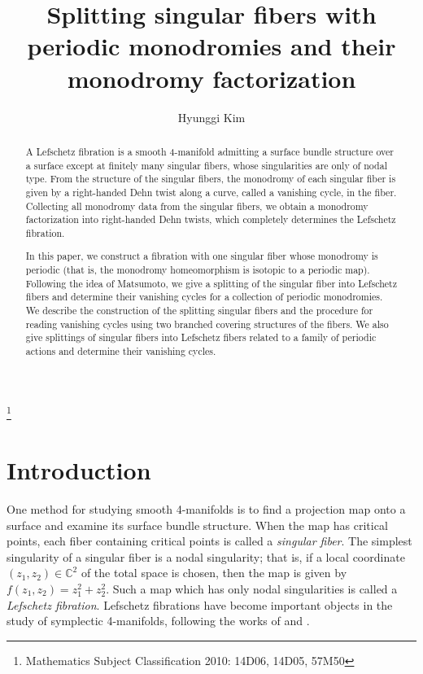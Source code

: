 \documentclass[10pt,a4paper,reqno]{amsart}
\theoremstyle{definition}
\numberwithin{equation}{section}
\numberwithin{figure}{section}
\newcommand{\C}{\mathbb{C}}
\begin{document}
\title[Splitting singular fibers]
{Splitting singular fibers with periodic monodromies and their monodromy factorization}

\author[H. Kim]{Hyunggi Kim}
\address{Research Institute of Mathematics, Seoul National University, Korea}

\thanks{Mathematics Subject Classification 2010: 14D06, 14D05, 57M50}

\maketitle


\begin{abstract}
A Lefschetz fibration is a smooth 4-manifold admitting a surface bundle structure over a surface except at finitely many singular fibers, whose singularities are only of nodal type.
From the structure of the singular fibers, the monodromy of each singular fiber is given by a right-handed Dehn twist along a curve, called a vanishing cycle, in the fiber.
Collecting all monodromy data from the singular fibers, we obtain a monodromy factorization into right-handed Dehn twists, which completely determines the Lefschetz fibration.

In this paper, we construct a fibration with one singular fiber whose monodromy is periodic (that is, the monodromy homeomorphism is isotopic to a periodic map).
Following the idea of Matsumoto, we give a splitting of the singular fiber into Lefschetz fibers and determine their vanishing cycles for a collection of periodic monodromies.
We describe the construction of the splitting singular fibers and the procedure for reading vanishing cycles using two branched covering structures of the fibers.
We also give splittings of singular fibers into Lefschetz fibers related to a family of periodic actions and determine their vanishing cycles.
\end{abstract}

\section{Introduction} \label{sec:intro}
One method for studying smooth 4-manifolds is to find a projection map onto a surface and examine its surface bundle structure.
When the map has critical points, each fiber containing critical points is called a \textit{singular fiber}.
The simplest singularity of a singular fiber is a nodal singularity; that is,
if a local coordinate $(z_1, z_2)\in \C^2$ of the total space is chosen, then the map is given by $f(z_1,z_2)=z_1^2+z_2^2$.
Such a map which has only nodal singularities is called a \textit{Lefschetz fibration}.
Lefschetz fibrations have become important objects in the study of symplectic 4-manifolds, following the works of \cite{D} and \cite{Go}.
\end{document}
